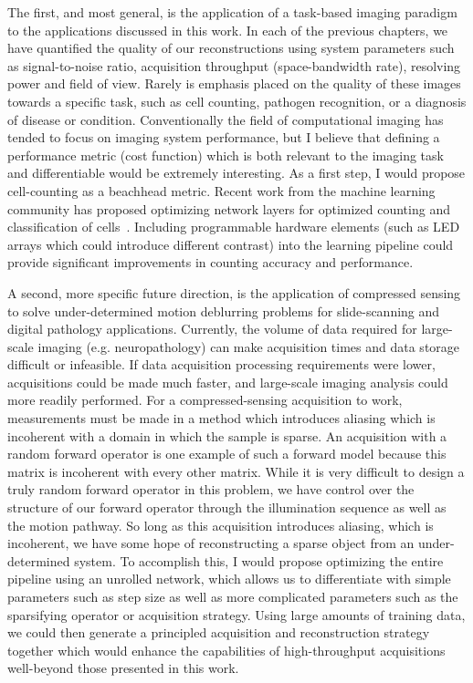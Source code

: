 The first, and most general, is the application of a task-based imaging paradigm to the applications discussed in this work. In each of the previous chapters, we have quantified the quality of our reconstructions using system parameters such as signal-to-noise ratio, acquisition throughput (space-bandwidth rate), resolving power and field of view. Rarely is emphasis placed on the quality of these images towards a specific task, such as cell counting, pathogen recognition, or a diagnosis of disease or condition. Conventionally the field of computational imaging has tended to focus on imaging system performance, but I believe that defining a performance metric (cost function) which is both relevant to the imaging task and differentiable would be extremely interesting. As a first step, I would propose cell-counting as a beachhead metric. Recent work from the machine learning community has proposed optimizing network layers for optimized counting and classification of cells~\cite{falk2019unet, xue2017cell}. Including programmable hardware elements (such as LED arrays which could introduce different contrast) into the learning pipeline could provide significant improvements in counting accuracy and performance.

A second, more specific future direction, is the application of compressed sensing to solve under-determined motion deblurring problems for slide-scanning and digital pathology applications. Currently, the volume of data required for large-scale imaging (e.g. neuropathology) can make acquisition times and data storage difficult or infeasible. If data acquisition processing requirements were lower, acquisitions could be made much faster, and large-scale imaging analysis could more readily performed. For a compressed-sensing acquisition to work, measurements must be made in a method which introduces aliasing which is incoherent with a domain in which the sample is sparse. An acquisition with a random forward operator is one example of such a forward model because this matrix is incoherent with every other matrix. While it is very difficult to design a truly random forward operator in this problem, we have control over the structure of our forward operator through the illumination sequence as well as the motion pathway. So long as this acquisition introduces aliasing, which is incoherent, we have some hope of reconstructing a sparse object from an under-determined system. To accomplish this, I would propose optimizing the entire pipeline using an unrolled network, which allows us to differentiate with simple parameters such as step size as well as more complicated parameters such as the sparsifying operator or acquisition strategy. Using large amounts of training data, we could then generate a principled acquisition and reconstruction strategy together which would enhance the capabilities of high-throughput acquisitions well-beyond those presented in this work.

